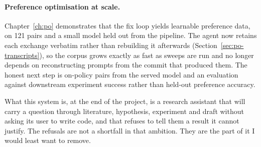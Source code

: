 \paragraph{Preference optimisation at scale.} Chapter~\ref{ch:po} demonstrates that
the fix loop yields learnable preference data, on 121 pairs and a small model held
out from the pipeline. The agent now retains each exchange verbatim rather than
rebuilding it afterwards (Section~\ref{sec:po-transcripts}), so the corpus grows
exactly as fast as sweeps are run and no longer depends on reconstructing prompts
from the commit that produced them. The honest next step is on-policy pairs from
the served model and an evaluation against downstream experiment success rather
than held-out preference accuracy.

\bigskip

What this system is, at the end of the project, is a research assistant that will
carry a question through literature, hypothesis, experiment and draft without
asking its user to write code, and that refuses to tell them a result it cannot
justify. The refusals are not a shortfall in that ambition. They are the part of it
I would least want to remove.
